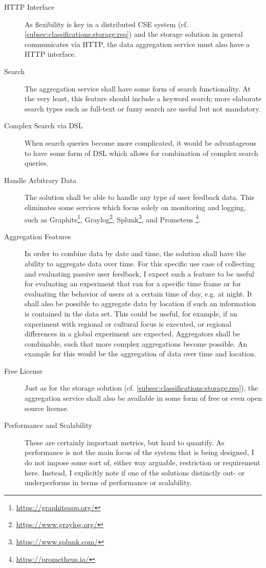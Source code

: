 \begin{description}
\item [HTTP Interface]
As flexibility is key in a distributed \ac{CSE} system (cf. \cref{subsec:classifications:storage:req}) and the storage solution in general communicates via HTTP, the data aggregation service must also have a HTTP interface.
\item [Search]
The aggregation service shall have some form of search functionality.
At the very least, this feature should include a keyword search; more elaborate search types such as full-text or fuzzy search are useful but not mandatory.
\item [Complex Search via DSL]
When search queries become more complicated, it would be advantageous to have some form of \ac{DSL} which allows for combination of complex search queries.
\item [Handle Arbitrary Data]
The solution shall be able to handle any type of user feedback data.
This eliminates some services which focus solely on monitoring and logging, such as Graphite\footnote{\url{https://graphiteapp.org/}}, Graylog\footnote{\url{https://www.graylog.org/}}, Splunk\footnote{\url{https://www.splunk.com/}}, and Prometeus \footnote{\url{https://prometheus.io/}}.
\item [Aggregation Features]
In order to combine data by date and time, the solution shall have the ability to aggregate data over time.
For this specific use case of collecting and evaluating passive user feedback, I expect such a feature to be useful for evaluating an experiment that ran for a specific time frame or for evaluating the behavior of users at a certain time of day, e.g. at night.
It shall also be possible to aggregate data by location if such an information is contained in the data set.
This could be useful, for example, if an experiment with regional or cultural focus is executed, or regional differences in a global experiment are expected.
Aggregators shall be combinable, such that more complex aggregations become possible.
An example for this would be the aggregation of data over time and location.
\item [Free License]
Just as for the storage solution (cf. \cref{subsec:classifications:storage:req}), the aggregation service shall also be available in some form of free or even open source license.
\item [Performance and Scalability]
These are certainly important metrics, but hard to quantify.
As performance is not the main focus of the system that is being designed, I do not impose some sort of, either way arguable, restriction or requirement here.
Instead, I explicitly note if one of the solutions distinctly out- or underperforms in terms of performance or scalability.
\end{description}

